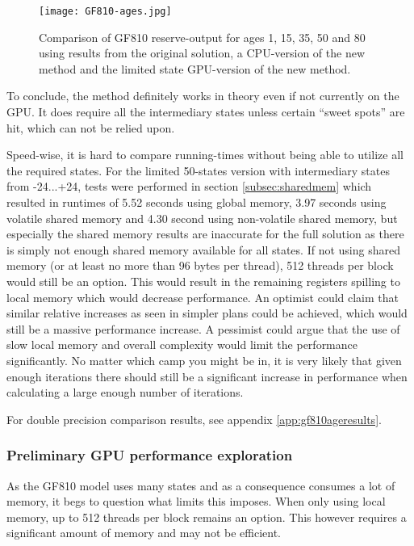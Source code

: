 \begin{figure}[h!]\centering
\texttt{[image: GF810-ages.jpg]}
\caption{Comparison of GF810 reserve-output for ages 1, 15, 35, 50 and 80 using results from the original solution, a CPU-version of the new method and the limited state GPU-version of the new method.\label{fig:gf810ages}}
\end{figure}

To conclude, the method definitely works in theory even if not currently on the GPU.
It does require all the intermediary states unless certain ``sweet spots'' are hit, which can not be relied upon.

Speed-wise, it is hard to compare running-times without being able to utilize all the required states.
For the limited 50-states version with intermediary states from -24...+24, tests were performed in section \ref{subsec:sharedmem} which resulted in runtimes of 5.52 seconds using global memory, 3.97 seconds using volatile shared memory and 4.30 second using non-volatile shared memory, but especially the shared memory results are inaccurate for the full solution as there is simply not enough shared memory available for all states.
If not using shared memory (or at least no more than 96 bytes per thread), 512 threads per block would still be an option.
This would result in the remaining registers spilling to local memory which would decrease performance.
An optimist could claim that similar relative increases as seen in simpler plans could be achieved, which would still be a massive performance increase.
A pessimist could argue that the use of slow local memory and overall complexity would limit the performance significantly.
No matter which camp you might be in, it is very likely that given enough iterations there should still be a significant increase in performance when calculating a large enough number of iterations.

For double precision comparison results, see appendix \ref{app:gf810ageresults}.

\subsubsection{Preliminary GPU performance exploration}
As the GF810 model uses many states and as a consequence consumes a lot of memory, it begs to question what limits this imposes.
When only using local memory, up to 512 threads per block remains an option.
This however requires a significant amount of memory and may not be efficient.


